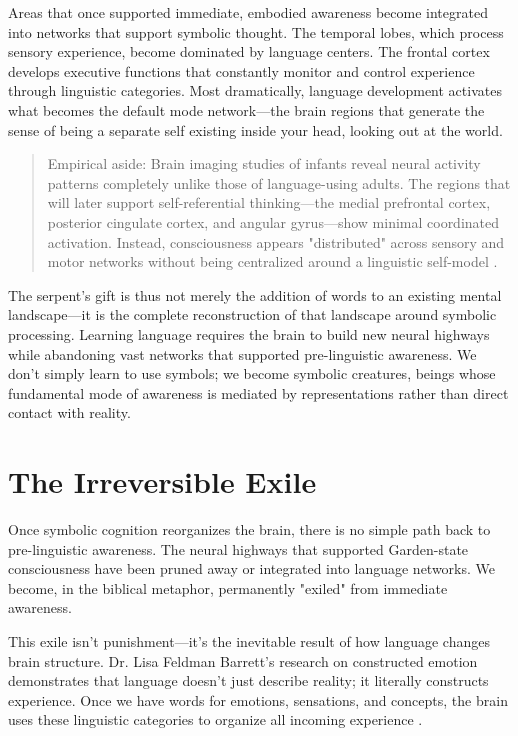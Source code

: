 Areas that once supported immediate, embodied awareness become integrated into networks that support symbolic thought. The temporal lobes, which process sensory experience, become dominated by language centers. The frontal cortex develops executive functions that constantly monitor and control experience through linguistic categories. Most dramatically, language development activates what becomes the default mode network—the brain regions that generate the sense of being a separate self existing inside your head, looking out at the world.

\begin{quote}\small
Empirical aside: Brain imaging studies of infants reveal neural activity patterns completely unlike those of language-using adults. The regions that will later support self-referential thinking—the medial prefrontal cortex, posterior cingulate cortex, and angular gyrus—show minimal coordinated activation. Instead, consciousness appears "distributed" across sensory and motor networks without being centralized around a linguistic self-model \parencite{gao2009evidence,buckner2008brain}.
\end{quote}

The serpent's gift is thus not merely the addition of words to an existing mental landscape—it is the complete reconstruction of that landscape around symbolic processing. Learning language requires the brain to build new neural highways while abandoning vast networks that supported pre-linguistic awareness. We don't simply learn to use symbols; we become symbolic creatures, beings whose fundamental mode of awareness is mediated by representations rather than direct contact with reality.

\section{The Irreversible Exile}

Once symbolic cognition reorganizes the brain, there is no simple path back to pre-linguistic awareness. The neural highways that supported Garden-state consciousness have been pruned away or integrated into language networks. We become, in the biblical metaphor, permanently "exiled" from immediate awareness.

This exile isn't punishment—it's the inevitable result of how language changes brain structure. Dr. Lisa Feldman Barrett's research on constructed emotion demonstrates that language doesn't just describe reality; it literally constructs experience. Once we have words for emotions, sensations, and concepts, the brain uses these linguistic categories to organize all incoming experience \parencite{barrett2017constructed}.

